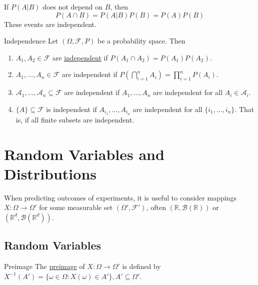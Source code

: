 \documentclass{article}
\newcommand{\R}{\mathbb{R}}
\begin{document}
	
	If $P(A|B)$ does not depend on $B$, then $$P(A\cap B)=P(A|B)P(B)=P(A)P(B)$$
	These events are independent.
	\begin{mydef}{Independence}{}
		Let $(\Omega, \mathcal{F}, P)$ be a probability space. Then
		\begin{enumerate}[label=(\roman*)]
			\item $A_1, A_2\in\mathcal{F}$ are \underline{independent} if $P(A_1\cap A_2)=P(A_1)P(A_2)$.
			
			\item $A_1, \dots, A_n\in\mathcal{F}$ are independent if $P(\bigcap_{i=1}^{n}A_i)=\prod_{i=1}^{n}P(A_i)$.
			
			\item $\mathcal{A}_1, \dots, \mathcal{A}_n\subseteq\mathcal{F}$ are independent if $A_1, \dots, A_n$ are independent for all $A_i\in\mathcal{A}_i$.
			
			\item $\{A\}\subseteq\mathcal{F}$ is independent if $A_{i_1}, \dots, A_{i_n}$ are independent for all $\{i_1, \dots, i_n\}$. That is, if all finite subsets are independent.
		\end{enumerate}
	\end{mydef}
	
	\newpage
	\section{Random Variables and Distributions}
	When predicting outcomes of experiments, it is useful to consider mappings $X : \Omega\to\Omega'$ for some measurable set $(\Omega', \mathcal{F}')$, often $(\R, \mathcal{B}(\R))$ or $(\R^d, \mathcal{B}(\R^d))$.
	
	\subsection{Random Variables}
	\begin{mydef}{Preimage}{}
		The \underline{preimage} of $X : \Omega\to\Omega'$ is defined by $X^{-1}(A')=\{\omega\in\Omega : X(\omega)\in A'\}, A'\subseteq\Omega'$.
	\end{mydef}
	
\end{document}
